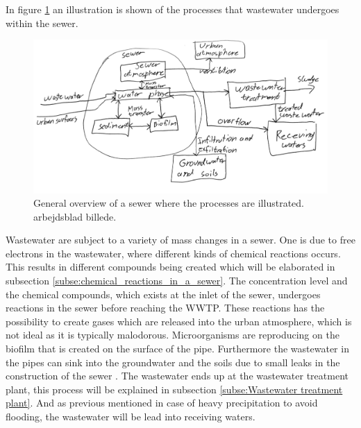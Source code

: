 
In figure \ref{fig:sewer_overview_of_the_chemical_process} an illustration is shown of the processes that wastewater undergoes within the sewer.
\begin{figure}[H]
\centering
\includegraphics[width=1\textwidth]{report/introduction/pictures/detailed_sewer.pdf}
\caption{General overview of a sewer where the processes are illustrated. arbejdsblad billede. }
\label{fig:sewer_overview_of_the_chemical_process}
\end{figure}

Wastewater are subject to a variety of mass changes in a sewer. One is due to free electrons in the wastewater, where different kinds of chemical reactions occurs. This results in different compounds being created which will be elaborated in subsection \ref{subse:chemical_reactions_in_a_sewer}. The concentration level and the chemical compounds, which exists at the inlet of the sewer, undergoes reactions in the sewer before reaching the WWTP. These reactions has the possibility to create gases which are released into the urban atmosphere, which is not ideal as it is typically malodorous. %
Microorganisms are reproducing on the biofilm that is created on the surface of the pipe. Furthermore the wastewater in the pipes can sink into the groundwater and the soils due to small leaks in the construction of the sewer . The wastewater ends up at the wastewater treatment plant, this process will be explained in subsection \ref{subse:Wastewater treatment plant}. And as previous mentioned in case of heavy precipitation to avoid flooding, the wastewater will be lead into receiving waters. 


